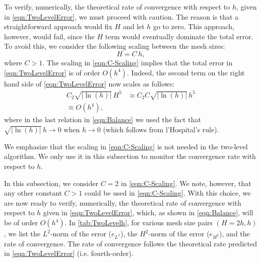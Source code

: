 To verify, numerically, the theoretical rate of convergence with respect to
$h$, given in \eqref{eqn:TwoLevelError}, we must proceed with caution. The reason is
that a straightforward approach would fix $H$ and let $h$ go to zero. This
approach, however, would fail, since the $H$ term would eventually dominate the
total error. To avoid this, we consider the following scaling between the mesh
sizes:
\begin{equation}
  H = C\, h,
  \label{eqn:C-Scaling}
\end{equation}
where $C>1$. The scaling in \eqref{eqn:C-Scaling} implies that the total error
in \eqref{eqn:TwoLevelError} is of order $O(h^4)$. Indeed, the second term on the
right hand side of \eqref{eqn:TwoLevelError} now scales as follows:
\begin{equation}
  \begin{split}
    C_2 \sqrt{|\ln(h)|}\, H^5 &\approx C_2 C \sqrt{|\ln(h)|}\, h^5 \\[0.2em]
    \approx O(h^4),
  \end{split}
  \label{eqn:Balance}
\end{equation}
where in the last relation in \eqref{eqn:Balance} we used the fact that
$\sqrt{|\ln(h)|}\, h \rightarrow 0$ when $h \rightarrow 0$ (which follows from
l'Hospital's rule).

\begin{remark}
  We emphasize that the scaling in \eqref{eqn:C-Scaling} is not needed in the
  two-level algorithm. We only use it in this subsection to monitor the
  convergence rate with respect to $h$.
\end{remark}

In this subsection, we consider $C=2$ in \eqref{eqn:C-Scaling}. We note,
however, that any other constant $C>1$ could be used in \eqref{eqn:C-Scaling}.
With this choice, we are now ready to verify, numerically, the theoretical rate
of convergence with respect to $h$ given in \eqref{eqn:TwoLevelError}, which, as
shown in \eqref{eqn:Balance}, will be of order $O(h^4)$. In
\autoref{tab:TwoLevelh}, for various mesh size pairs $(H=2h, h)$, we list the
$L^2$-norm of the error ($e_{L^2}$), the $H^2$-norm of the error ($e_{H^2}$),
and the rate of convergence. The rate of convergence follows the theoretical
rate predicted in \eqref{eqn:TwoLevelError} (i.e. fourth-order).

